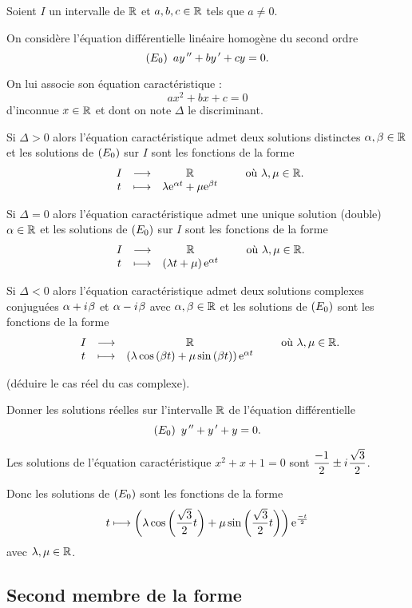\begin{prop}
Soient \(I\) un intervalle de \(\mathbb{R}\) et \(a,b,c\in\mathbb{R}\) tels que \(a\not=0\).

On considère l'équation différentielle linéaire homogène du second ordre \[\left(E_0\right)~ay^{\,\prime\prime}+by^{\,\prime}+cy=0.\]

On lui associe son équation caractéristique : \[ax^2+bx+c=0\] d'inconnue \(x\in\mathbb{R}\) et dont on note \(\Delta\) le discriminant.

Si \(\Delta>0\) alors l'équation caractéristique admet deux solutions distinctes \(\alpha,\beta\in\mathbb{R}\) et les solutions de \(\left(E_0\right)\) sur \(I\) sont les fonctions de la forme \[\begin{array}[t]{ccc}I & \longrightarrow & \mathbb{R} \\ t & \longmapsto & \lambda\mathrm{e}^{\alpha t}+\mu\mathrm{e}^{\beta t}\end{array}\qquad\text{où }\lambda,\mu\in\mathbb{R}.\]

Si \(\Delta=0\) alors l'équation caractéristique admet une unique solution (double) \(\alpha\in\mathbb{R}\) et les solutions de \(\left(E_0\right)\) sur \(I\) sont les fonctions de la forme \[\begin{array}[t]{ccc}I & \longrightarrow & \mathbb{R} \\ t & \longmapsto & \left(\lambda t+\mu\right)\mathrm{e}^{\alpha t}\end{array}\qquad\text{où }\lambda,\mu\in\mathbb{R}.\]

Si \(\Delta<0\) alors l'équation caractéristique admet deux solutions complexes conjuguées \(\alpha+i\mkern1mu\beta\) et \(\alpha-i\mkern1mu\beta\) avec \(\alpha,\beta\in\mathbb{R}\) et les solutions de \(\left(E_0\right)\) sont les fonctions de la forme \[\begin{array}[t]{ccc}I & \longrightarrow & \mathbb{R} \\ t & \longmapsto & \left(\lambda\cos\left(\beta t\right)+\mu\sin\left(\beta t\right)\right)\mathrm{e}^{\alpha t}\end{array}\qquad\text{où }\lambda,\mu\in\mathbb{R}.\]
\end{prop}

\begin{dem}
 (déduire le cas réel du cas complexe).
\end{dem}

\begin{exoex}
Donner les solutions réelles sur l'intervalle \(\mathbb{R}\) de l'équation différentielle \[\left(E_0\right)~y^{\,\prime\prime}+y^{\,\prime}+y=0.\]
\end{exoex}

\begin{corr}
Les solutions de l'équation caractéristique \(x^2+x+1=0\) sont \(\dfrac{-1}{2}\pm i\mkern1mu\dfrac{\sqrt{3}}{2}\).

Donc les solutions de \(\left(E_0\right)\) sont les fonctions de la forme \[t\longmapsto\left(\lambda\cos\left(\dfrac{\sqrt{3}}{2}t\right)+\mu\sin\left(\dfrac{\sqrt{3}}{2}t\right)\right)\mathrm{e}^{\frac{-t}{2}}\] avec \(\lambda,\mu\in\mathbb{R}\).
\end{corr}

\subsection{Second membre de la forme }

